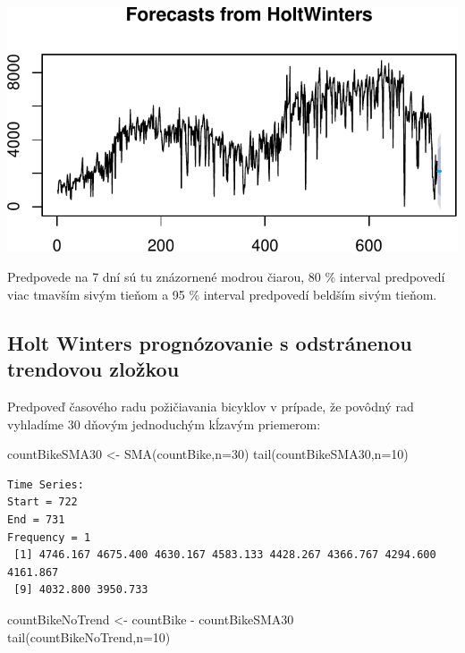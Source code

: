 \documentclass[
  letterpaper,
  DIV=11,
  numbers=noendperiod]{scrreprt}
\newenvironment{Shaded}{\begin{snugshade}}{\end{snugshade}}
\newcommand{\AttributeTok}[1]{\textcolor[rgb]{0.40,0.45,0.13}{#1}}
\newcommand{\DecValTok}[1]{\textcolor[rgb]{0.68,0.00,0.00}{#1}}
\newcommand{\FunctionTok}[1]{\textcolor[rgb]{0.28,0.35,0.67}{#1}}
\newcommand{\NormalTok}[1]{\textcolor[rgb]{0.00,0.23,0.31}{#1}}
\newcommand{\OtherTok}[1]{\textcolor[rgb]{0.00,0.23,0.31}{#1}}
\newcommand{\SpecialCharTok}[1]{\textcolor[rgb]{0.37,0.37,0.37}{#1}}
\begin{document}
\includegraphics{prednaska2_HoltWinters_files/figure-pdf/unnamed-chunk-9-1.pdf}

Predpovede na 7 dní sú tu znázornené modrou čiarou, 80 \% interval
predpovedí viac tmavším sivým tieňom a 95 \% interval predpovedí beldším
sivým tieňom.

\subsection{Holt Winters prognózovanie s odstránenou trendovou
zložkou}\label{holt-winters-prognuxf3zovanie-s-odstruxe1nenou-trendovou-zloux17ekou}

Predpoveď časového radu požičiavania bicyklov v prípade, že povôdný rad
vyhladíme 30 dňovým jednoduchým kĺzavým priemerom:

\begin{Shaded}
\begin{Highlighting}[]
\NormalTok{countBikeSMA30 }\OtherTok{\textless{}{-}} \FunctionTok{SMA}\NormalTok{(countBike,}\AttributeTok{n=}\DecValTok{30}\NormalTok{)}
\FunctionTok{tail}\NormalTok{(countBikeSMA30,}\AttributeTok{n=}\DecValTok{10}\NormalTok{)}
\end{Highlighting}
\end{Shaded}

\begin{verbatim}
Time Series:
Start = 722 
End = 731 
Frequency = 1 
 [1] 4746.167 4675.400 4630.167 4583.133 4428.267 4366.767 4294.600 4161.867
 [9] 4032.800 3950.733
\end{verbatim}

\begin{Shaded}
\begin{Highlighting}[]
\NormalTok{countBikeNoTrend }\OtherTok{\textless{}{-}}\NormalTok{ countBike }\SpecialCharTok{{-}}\NormalTok{ countBikeSMA30}
\FunctionTok{tail}\NormalTok{(countBikeNoTrend,}\AttributeTok{n=}\DecValTok{10}\NormalTok{)}
\end{Highlighting}
\end{Shaded}
\end{document}
